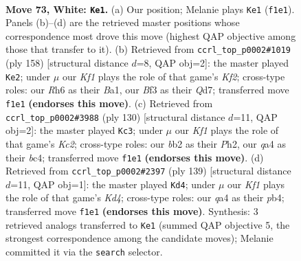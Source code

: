 \documentclass[11pt]{article}
\begin{document}
\clearpage

\begin{figure}[p]\centering
\begin{subfigure}{0.46\textwidth}\centering
\resizebox{\linewidth}{!}{%
\newchessgame
\chessboard[
  setfen={8/8/7R/8/q7/1p1k1B2/1b6/5K2 w - - 2 73},
  showmover=false,
  pgfstyle=straightmove, color=movearrow, markmove={f1-e1}
]}
\caption{}
\end{subfigure}\hfill
\begin{subfigure}{0.46\textwidth}\centering
\resizebox{\linewidth}{!}{%
\newchessgame
\chessboard[
  setfen={8/3Q4/8/q7/5k2/p7/5K2/B7 w - - 2 80},
  showmover=false,
  pgfstyle=straightmove, color=movearrow, markmove={f2-e2}
]}
\caption{}
\end{subfigure}
\\[4pt]
\begin{subfigure}{0.46\textwidth}\centering
\resizebox{\linewidth}{!}{%
\newchessgame
\chessboard[
  setfen={8/8/8/8/2b5/4k3/2K2pBP/8 w - - 12 66},
  showmover=false,
  pgfstyle=straightmove, color=movearrow, markmove={c2-c3}
]}
\caption{}
\end{subfigure}\hfill
\begin{subfigure}{0.46\textwidth}\centering
\resizebox{\linewidth}{!}{%
\newchessgame
\chessboard[
  setfen={3b4/8/8/3k4/KP6/8/4Bp2/8 b - - 10 70},
  showmover=false,
  pgfstyle=straightmove, color=movearrow, markmove={d5-d4}
]}
\caption{}
\end{subfigure}
\caption{\textbf{Move 73, White: \texttt{Ke1}.} (a) Our position; Melanie plays \texttt{Ke1} (\texttt{f1e1}). Panels (b)--(d) are the retrieved master positions whose correspondence most drove this move (highest QAP objective among those that transfer to it). (b) Retrieved from \texttt{ccrl\_top\_p0002\#1019} (ply 158) [structural distance $d$=8, QAP obj=2]: the master played \texttt{Ke2}; under $\mu$ our \emph{Kf1} plays the role of that game's \emph{Kf2}; cross-type roles: our \emph{R}h6 as their \emph{B}a1, our \emph{B}f3 as their \emph{Q}d7; transferred move \texttt{f1e1} \textbf{(endorses this move)}. (c) Retrieved from \texttt{ccrl\_top\_p0002\#3988} (ply 130) [structural distance $d$=11, QAP obj=2]: the master played \texttt{Kc3}; under $\mu$ our \emph{Kf1} plays the role of that game's \emph{Kc2}; cross-type roles: our \emph{b}b2 as their \emph{P}h2, our \emph{q}a4 as their \emph{b}c4; transferred move \texttt{f1e1} \textbf{(endorses this move)}. (d) Retrieved from \texttt{ccrl\_top\_p0002\#2397} (ply 139) [structural distance $d$=11, QAP obj=1]: the master played \texttt{Kd4}; under $\mu$ our \emph{Kf1} plays the role of that game's \emph{Kd4}; cross-type roles: our \emph{q}a4 as their \emph{p}b4; transferred move \texttt{f1e1} \textbf{(endorses this move)}. Synthesis: 3 retrieved analogs transferred to \texttt{Ke1} (summed QAP objective 5, the strongest correspondence among the candidate moves); Melanie committed it via the \texttt{search} selector.}
\label{fig:thought-m144}
\end{figure}
\end{document}
